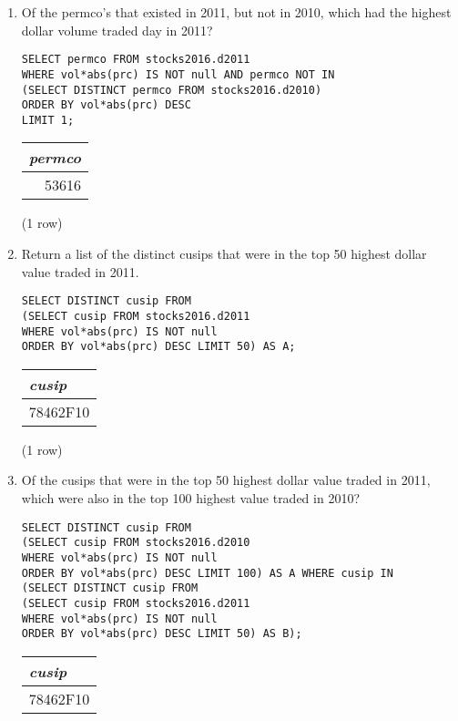 \documentclass[]{article}
\newenvironment{question}[2][Question]{\begin{trivlist}
\item[\hskip \labelsep {\bfseries #1}\hskip \labelsep {\bfseries #2.}]}{\end{trivlist}}
\begin{document}
\begin{question}{1}
\begin{enumerate}[label=(\alph*)]
\item Of the permco's that existed in 2011, but not in 2010, which had the highest dollar volume traded day in 2011?
  \color{blue}
\begin{verbatim}
SELECT permco FROM stocks2016.d2011
WHERE vol*abs(prc) IS NOT null AND permco NOT IN
(SELECT DISTINCT permco FROM stocks2016.d2010)
ORDER BY vol*abs(prc) DESC
LIMIT 1;
  \end{verbatim}
\color{black}

\begin{center}
\begin{tabular}{r}
\textit{permco} \\
\hline
53616 \\
\end{tabular}

\noindent (1 row) \\
\end{center}

\item Return a list of the distinct cusips that were in the top 50 highest dollar value traded in 2011.
  \color{blue}
\begin{verbatim}
SELECT DISTINCT cusip FROM
(SELECT cusip FROM stocks2016.d2011
WHERE vol*abs(prc) IS NOT null
ORDER BY vol*abs(prc) DESC LIMIT 50) AS A;
  \end{verbatim}
\color{black}

\begin{center}
\begin{tabular}{l}
\textit{cusip} \\
\hline
78462F10 \\
\end{tabular}

\noindent (1 row) \\
\end{center}

\item Of the cusips that were in the top 50 highest dollar value traded in 2011, which were also in the top 100 highest value traded in 2010?
  \color{blue}
\begin{verbatim}
SELECT DISTINCT cusip FROM
(SELECT cusip FROM stocks2016.d2010
WHERE vol*abs(prc) IS NOT null
ORDER BY vol*abs(prc) DESC LIMIT 100) AS A WHERE cusip IN
(SELECT DISTINCT cusip FROM
(SELECT cusip FROM stocks2016.d2011
WHERE vol*abs(prc) IS NOT null
ORDER BY vol*abs(prc) DESC LIMIT 50) AS B);
  \end{verbatim}
\color{black}

\begin{center}
\begin{tabular}{l}
\textit{cusip} \\
\hline
78462F10 \\
\end{tabular}


\end{center}
\end{enumerate}
\end{question}
\end{document}
